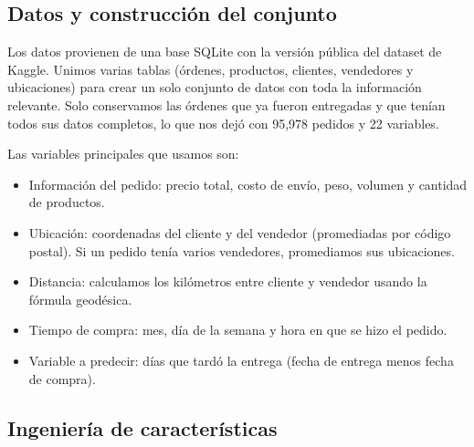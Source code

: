 \documentclass[journal]{IEEEtran}
\begin{document}
\subsection{Datos y construcción del conjunto}

Los datos provienen de una base SQLite con la versión pública del dataset de Kaggle. Unimos varias tablas (órdenes, productos, clientes, vendedores y ubicaciones) para crear un solo conjunto de datos con toda la información relevante. Solo conservamos las órdenes que ya fueron entregadas y que tenían todos sus datos completos, lo que nos dejó con 95{,}978 pedidos y 22 variables.

Las variables principales que usamos son:
\begin{itemize}
	\item Información del pedido: precio total, costo de envío, peso, volumen y cantidad de productos.
	\item Ubicación: coordenadas del cliente y del vendedor (promediadas por código postal). Si un pedido tenía varios vendedores, promediamos sus ubicaciones.
	\item Distancia: calculamos los kilómetros entre cliente y vendedor usando la fórmula geodésica.
	\item Tiempo de compra: mes, día de la semana y hora en que se hizo el pedido.
	\item Variable a predecir: días que tardó la entrega (fecha de entrega menos fecha de compra).
\end{itemize}

\subsection{Ingeniería de características}
\end{document}
